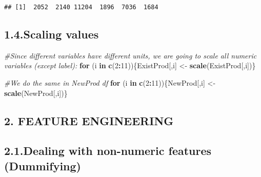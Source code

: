 \documentclass[]{article}
\newenvironment{Shaded}{\begin{snugshade}}{\end{snugshade}}
\newcommand{\CommentTok}[1]{\textcolor[rgb]{0.56,0.35,0.01}{\textit{#1}}}
\newcommand{\ControlFlowTok}[1]{\textcolor[rgb]{0.13,0.29,0.53}{\textbf{#1}}}
\newcommand{\DecValTok}[1]{\textcolor[rgb]{0.00,0.00,0.81}{#1}}
\newcommand{\KeywordTok}[1]{\textcolor[rgb]{0.13,0.29,0.53}{\textbf{#1}}}
\newcommand{\NormalTok}[1]{#1}
\newcommand{\OperatorTok}[1]{\textcolor[rgb]{0.81,0.36,0.00}{\textbf{#1}}}
\newcommand{\StringTok}[1]{\textcolor[rgb]{0.31,0.60,0.02}{#1}}
\begin{document}
\begin{verbatim}
## [1]  2052  2140 11204  1896  7036  1684
\end{verbatim}

\begin{Shaded}
\end{Shaded}

\hypertarget{scaling-values}{%
\subsection{1.4.Scaling values}\label{scaling-values}}

\begin{Shaded}
\begin{Highlighting}[]
\CommentTok{#Since different variables have different units, we are going to scale all numeric variables (except label):}
\ControlFlowTok{for}\NormalTok{ (i }\ControlFlowTok{in} \KeywordTok{c}\NormalTok{(}\DecValTok{2}\OperatorTok{:}\DecValTok{11}\NormalTok{))\{ExistProd[,i] <-}\StringTok{ }\KeywordTok{scale}\NormalTok{(ExistProd[,i])\}}

\CommentTok{#We do the same in NewProd df}
\ControlFlowTok{for}\NormalTok{ (i }\ControlFlowTok{in} \KeywordTok{c}\NormalTok{(}\DecValTok{2}\OperatorTok{:}\DecValTok{11}\NormalTok{))\{NewProd[,i] <-}\StringTok{ }\KeywordTok{scale}\NormalTok{(NewProd[,i])\}}
\end{Highlighting}
\end{Shaded}

\hypertarget{feature-engineering}{%
\subsection{2. FEATURE ENGINEERING}\label{feature-engineering}}

\hypertarget{dealing-with-non-numeric-features-dummifying}{%
\subsection{2.1.Dealing with non-numeric features
(Dummifying)}\label{dealing-with-non-numeric-features-dummifying}}
\end{document}
